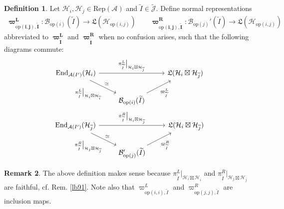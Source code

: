 \documentclass[11pt,b5paper,notitlepage]{article}
\theoremstyle{definition}
\newtheorem{df}{Definition}[section]
\newtheorem{rem}[df]{Remark}
\theoremstyle{plain}
\newcommand{\fk}{\mathfrak}
\newcommand{\wtd}{\widetilde}
\newcommand{\ovl}{\overline}
\newcommand{\End}{\mathrm{End}} %
\newcommand{\Jtd}{\widetilde{\mathcal J}}
\newcommand{\RepA}{\mathrm{Rep}(\mathcal A)}
\newcommand{\MA}{\mathcal A}
\newcommand{\MH}{\mathcal H}
\newcommand{\Bopi}{\mathcal B_{\mathrm{op}(i)}}
\newcommand{\Bopj}{\mathcal B_{\mathrm{op}(j)}}
\newcommand{\Hopij}{\mathcal H_{\mathrm{op}(i,j)}}
\newcommand{\opij}{\mathrm{op}(i,j)}
\newcommand{\opii}{\mathrm{op}(i,i)}
\newcommand{\opjj}{\mathrm{op}(j,j)}
\numberwithin{equation}{section}
\begin{document}
\begin{df}\label{lb118}
Let $\MH_i,\MH_j\in\RepA$ and $\wtd I\in\Jtd$. Define normal representations
\begin{gather*}
\pmb{\varpi^L_{\opij,\wtd I}}:\Bopi(\wtd I)\rightarrow\fk L(\Hopij)\qquad \pmb{\varpi^R_{\opij,\wtd I}}:\Bopj'(\wtd I)\rightarrow\fk L(\Hopij)
\end{gather*}
abbreviated to $\pmb{\varpi^L_{\wtd I}}$ and $\pmb{\varpi^R_{\wtd I}}$ when no confusion arises, such that the following diagrams commute:
\begin{gather*}
\begin{tikzcd}[ampersand replacement=\&]
\End_{\MA(I')}(\MH_i) \arrow[rr,"{\pi^L_{\wtd I}\big|_{\MH_i\boxtimes\MH_{\ovl j}}}"] \arrow[rd,"{\pi^L_{\wtd I}\big|_{\MH_i\boxtimes\MH_{\ovl i}}}"',"\simeq"] \&              \& \fk L(\MH_i\boxtimes\MH_{\ovl j}) \\
                        \& \Bopi(\wtd I) \arrow[ru,"\varpi^L_{\wtd I}"'] \&  
\end{tikzcd}\\
\begin{tikzcd}[ampersand replacement=\&]
\End_{\MA(I')}(\MH_{\ovl j}) \arrow[rr,"{\pi^R_{\wtd I}\big|_{\MH_i\boxtimes\MH_{\ovl j}}}"] \arrow[rd,"{\pi^R_{\wtd I}\big|_{\MH_j\boxtimes\MH_{\ovl j}}}"',"\simeq"] \&              \& \fk L(\MH_i\boxtimes\MH_{\ovl j}) \\
                        \& \Bopj'(\wtd I) \arrow[ru,"\varpi^R_{\wtd I}"'] \&  
\end{tikzcd}
\end{gather*}
\end{df}

\begin{rem}
The above definition makes sense because $\pi^L_{\wtd I}\big|_{\MH_i\boxtimes\MH_{\ovl i}}$ and $\pi^R_{\wtd I}\big|_{\MH_j\boxtimes\MH_{\ovl j}}$ are faithful, cf. Rem. \ref{lb91}. Note also that $\varpi^L_{\opii,\wtd I}$ and $\varpi^R_{\opjj,\wtd I}$ are inclusion maps.
\end{rem}
\end{document}
